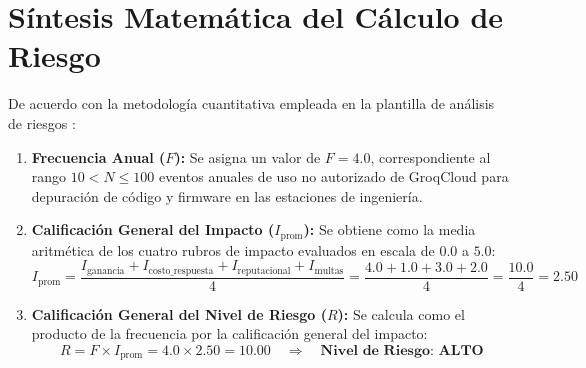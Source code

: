 \documentclass[letterpaper,11pt]{article}
\begin{document}
\vspace{0.4cm}

\section{Síntesis Matemática del Cálculo de Riesgo}

De acuerdo con la metodología cuantitativa empleada en la plantilla de análisis de riesgos \autocite{nist-sp800-30}:

\begin{enumerate}[leftmargin=1.5cm]
    \item \textbf{Frecuencia Anual ($F$):} Se asigna un valor de $F = 4.0$, correspondiente al rango $10 < N \leq 100$ eventos anuales de uso no autorizado de GroqCloud para depuración de código y firmware en las estaciones de ingeniería.
    \item \textbf{Calificación General del Impacto ($I_{\text{prom}}$):} Se obtiene como la media aritmética de los cuatro rubros de impacto evaluados en escala de $0.0$ a $5.0$:
    \[
        I_{\text{prom}} = \frac{I_{\text{ganancia}} + I_{\text{costo\_respuesta}} + I_{\text{reputacional}} + I_{\text{multas}}}{4} = \frac{4.0 + 1.0 + 3.0 + 2.0}{4} = \frac{10.0}{4} = 2.50
    \]
    \item \textbf{Calificación General del Nivel de Riesgo ($R$):} Se calcula como el producto de la frecuencia por la calificación general del impacto:
    \[
        R = F \times I_{\text{prom}} = 4.0 \times 2.50 = 10.00 \quad \Longrightarrow \quad \textbf{Nivel de Riesgo: ALTO}
    \]
\end{enumerate}

\newpage
\printbibliography[heading=bibintoc, title={Referencias}]
\end{document}
